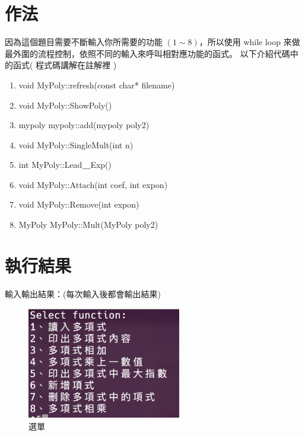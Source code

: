 \documentclass[12pt, a4paper]{article}
\begin{document}
  \section{\fontsize{20pt}{22pt}\selectfont 作法}
  \begin{samepage}
    \fontsize{16pt}{18pt} \selectfont
    因為這個題目需要不斷輸入你所需要的功能 $(1 \sim 8)$，所以使用 while loop 來做最外圍的流程控制，依照不同的輸入來呼叫相對應功能的函式。
    以下介紹代碼中的函式( 程式碼講解在註解裡 )
    \begin{enumerate}
      \item void MyPoly::refresh(const char* filename)
      
      \item void MyPoly::ShowPoly() 
      
      \item mypoly mypoly::add(mypoly poly2)
      
      \item void MyPoly::SingleMult(int n)
      
      \item int MyPoly::Lead＿Exp()
      
      \item void MyPoly::Attach(int coef, int expon)
      
      \item void MyPoly::Remove(int expon)
      
      \item MyPoly MyPoly::Mult(MyPoly poly2)
      
    \end{enumerate}
    \normalfont
  \end{samepage}

  \section{\fontsize{20pt}{22pt}\selectfont 執行結果}
      \fontsize{16pt}{18pt} \selectfont
        輸入輸出結果：(每次輸入後都會輸出結果)
        \begin{figure}[ht]
          \centering
          \includegraphics[width=0.6\textwidth]{./image/output.png}
          \caption{選單}
        \end{figure}
\end{document}
